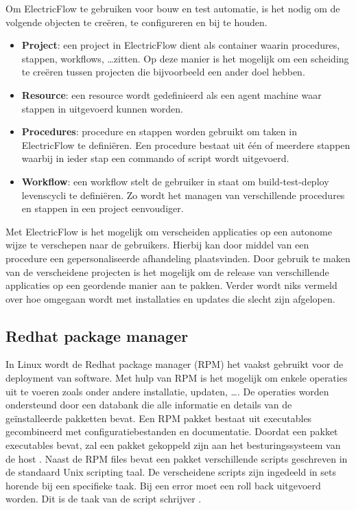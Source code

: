 Om ElectricFlow te gebruiken voor bouw en test automatie, is het nodig om de volgende objecten te creëren, te configureren en bij te houden.
\begin{itemize}
\item \textbf{Project}: een project in ElectricFlow dient als container waarin procedures, stappen, workflows, \ldots zitten.
Op deze manier is het mogelijk om een scheiding te creëren tussen projecten die bijvoorbeeld een ander doel hebben.
\item \textbf{Resource}: een resource wordt gedefinieerd als een agent machine waar stappen in uitgevoerd kunnen worden.
\item \textbf{Procedures}: procedure en stappen worden gebruikt om taken in ElectricFlow te definiëren.
Een procedure bestaat uit één of meerdere stappen waarbij in ieder stap een commando of script wordt uitgevoerd.
\item \textbf{Workflow}: een workflow stelt de gebruiker in staat om build-test-deploy levenscycli te definiëren.
Zo wordt het managen van verschillende procedures en stappen in een project eenvoudiger.
\end{itemize}

Met ElectricFlow is het mogelijk om verscheiden applicaties op een autonome wijze te verschepen naar de gebruikers.
Hierbij kan door middel van een procedure een gepersonaliseerde afhandeling plaatsvinden.
Door gebruik te maken van de verscheidene projecten is het mogelijk om de release van verschillende applicaties op een geordende manier aan te pakken. 
Verder wordt niks vermeld over hoe omgegaan wordt met installaties en updates die slecht zijn afgelopen.

\subsection{Redhat package manager}
In Linux wordt de Redhat package manager (RPM) het vaakst gebruikt voor de deployment van software.
Met hulp van RPM is het mogelijk om enkele operaties uit te voeren zoals onder andere installatie, updaten, \ldots .
De operaties worden ondersteund door een databank die alle informatie en details van de geïnstalleerde pakketten bevat.
Een RPM pakket bestaat uit executables gecombineerd met configuratiebestanden en documentatie.
Doordat een pakket executables bevat, zal een pakket gekoppeld zijn aan het besturingssysteem van de host \citep{bailey1997maximum}.
Naast de RPM files bevat een pakket verschillende scripts geschreven in de standaard Unix scripting taal.
De verscheidene scripts zijn ingedeeld in sets horende bij een specifieke taak.
Bij een error moet een roll back uitgevoerd worden.
Dit is de taak van de script schrijver \citep{softwareDeployment}.

